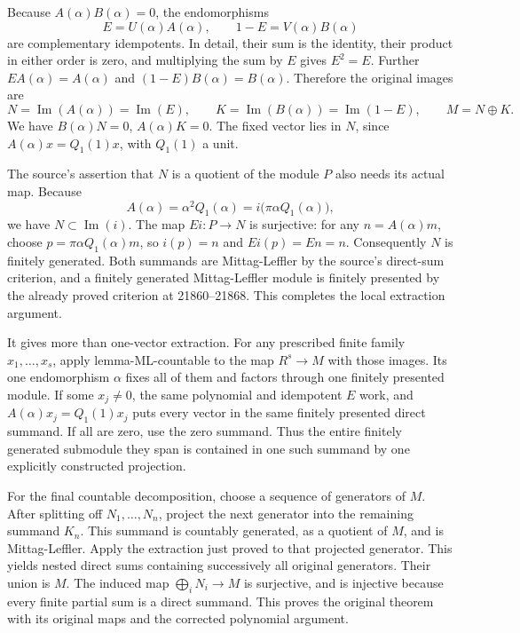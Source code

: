 Because \(A(\alpha)B(\alpha)=0\), the endomorphisms \[
E=U(\alpha)A(\alpha),\qquad
1-E=V(\alpha)B(\alpha)
\] are complementary idempotents. In detail, their sum is the identity, their product in either order is zero, and multiplying the sum by \(E\) gives \(E^2=E\). Further \(EA(\alpha)=A(\alpha)\) and \((1-E)B(\alpha)=B(\alpha)\). Therefore the original images are \[
N=\operatorname{Im}(A(\alpha))=\operatorname{Im}(E),\qquad
K=\operatorname{Im}(B(\alpha))=\operatorname{Im}(1-E),
\qquad M=N\oplus K .
\] We have \(B(\alpha)N=0\), \(A(\alpha)K=0\). The fixed vector lies in \(N\), since \(A(\alpha)x=Q_1(1)x\), with \(Q_1(1)\) a unit.

The source's assertion that \(N\) is a quotient of the module \(P\) also needs its actual map. Because \[
A(\alpha)=\alpha^2Q_1(\alpha)
=i\bigl(\pi\alpha Q_1(\alpha)\bigr),
\] we have \(N\subset\operatorname{Im}(i)\). The map \(Ei:P\to N\) is surjective: for any \(n=A(\alpha)m\), choose \(p=\pi\alpha Q_1(\alpha)m\), so \(i(p)=n\) and \(Ei(p)=En=n\). Consequently \(N\) is finitely generated. Both summands are Mittag-Leffler by the source's direct-sum criterion, and a finitely generated Mittag-Leffler module is finitely presented by the already proved criterion at 21860--21868. This completes the local extraction argument.

It gives more than one-vector extraction. For any prescribed finite family \(x_1,\ldots,x_s\), apply lemma-ML-countable to the map \(R^s\to M\) with those images. Its one endomorphism \(\alpha\) fixes all of them and factors through one finitely presented module. If some \(x_j\ne0\), the same polynomial and idempotent \(E\) work, and \(A(\alpha)x_j=Q_1(1)x_j\) puts every vector in the same finitely presented direct summand. If all are zero, use the zero summand. Thus the entire finitely generated submodule they span is contained in one such summand by one explicitly constructed projection.

For the final countable decomposition, choose a sequence of generators of \(M\). After splitting off \(N_1,\ldots,N_n\), project the next generator into the remaining summand \(K_n\). This summand is countably generated, as a quotient of \(M\), and is Mittag-Leffler. Apply the extraction just proved to that projected generator. This yields nested direct sums containing successively all original generators. Their union is \(M\). The induced map \(\bigoplus_iN_i\to M\) is surjective, and is injective because every finite partial sum is a direct summand. This proves the original theorem with its original maps and the corrected polynomial argument.


